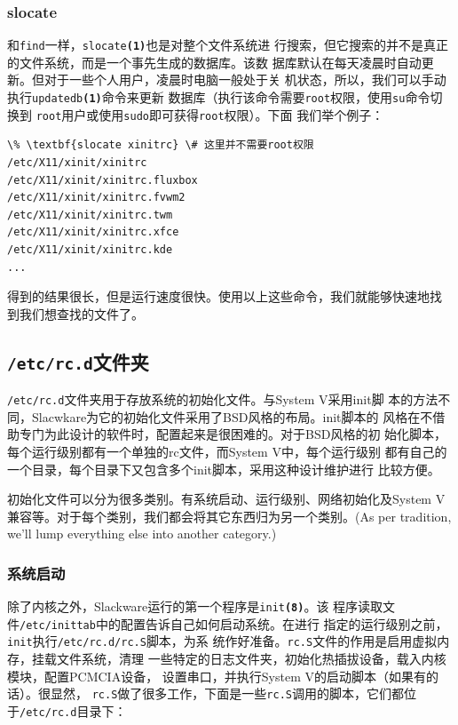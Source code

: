 \subsubsection{slocate}
\label{sec:systemConfig:systemOverview:findingFiles:slocate}
和\texttt{find}一样，\texttt{slocate\textbf{(1)}}也是对整个文件系统进
行搜索，但它搜索的并不是真正的文件系统，而是一个事先生成的数据库。该数
据库默认在每天凌晨时自动更新。但对于一些个人用户，凌晨时电脑一般处于关
机状态，所以，我们可以手动执行\texttt{updatedb\textbf{(1)}}命令来更新
数据库（执行该命令需要\texttt{root}权限，使用\texttt{su}命令切换到
\texttt{root}用户或使用\texttt{sudo}即可获得\texttt{root}权限）。下面
我们举个例子：
\begin{Verbatim}[frame=single, commandchars=\\\{\}]
\% \textbf{slocate xinitrc} \# 这里并不需要root权限
/etc/X11/xinit/xinitrc
/etc/X11/xinit/xinitrc.fluxbox
/etc/X11/xinit/xinitrc.fvwm2
/etc/X11/xinit/xinitrc.twm
/etc/X11/xinit/xinitrc.xfce
/etc/X11/xinit/xinitrc.kde
...
\end{Verbatim}
得到的结果很长，但是运行速度很快。使用以上这些命令，我们就能够快速地找
到我们想查找的文件了。

\subsection{\texttt{/etc/rc.d}文件夹}
\label{sec:systemConfig:systemOverview:etcRcd}
\texttt{/etc/rc.d}文件夹用于存放系统的初始化文件。与System V采用init脚
本的方法不同，Slacwkare为它的初始化文件采用了BSD风格的布局。init脚本的
风格在不借助专门为此设计的软件时，配置起来是很困难的。对于BSD风格的初
始化脚本，每个运行级别都有一个单独的rc文件，而System V中，每个运行级别
都有自己的一个目录，每个目录下又包含多个init脚本，采用这种设计维护进行
比较方便。

初始化文件可以分为很多类别。有系统启动、运行级别、网络初始化及System V
兼容等。对于每个类别，我们都会将其它东西归为另一个类别。(As per
tradition, we'll lump everything else into another category.)


\subsubsection{系统启动}
\label{sec:systemConfig:systemOverview:etcRcd:systemStartup}

除了内核之外，Slackware运行的第一个程序是\texttt{init\textbf{(8)}}。该
程序读取文件\texttt{/etc/inittab}中的配置告诉自己如何启动系统。在进行
指定的运行级别之前，\texttt{init}执行\texttt{/etc/rc.d/rc.S}脚本，为系
统作好准备。\texttt{rc.S}文件的作用是启用虚拟内存，挂载文件系统，清理
一些特定的日志文件夹，初始化热插拔设备，载入内核模块，配置PCMCIA设备，
设置串口，并执行System V的启动脚本（如果有的话）。很显然，
\texttt{rc.S}做了很多工作，下面是一些\texttt{rc.S}调用的脚本，它们都位
于\texttt{/etc/rc.d}目录下：

